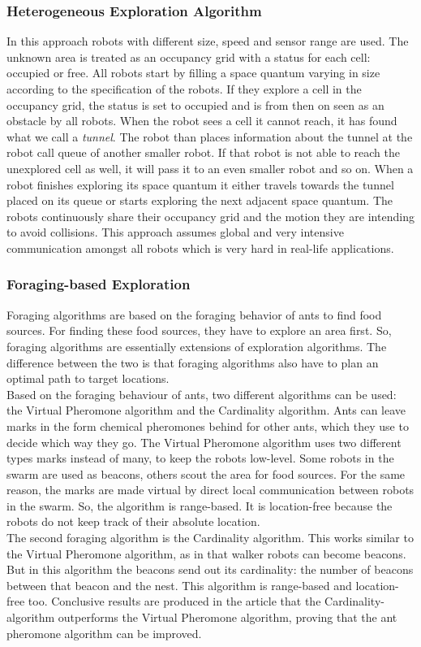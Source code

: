 	\subsubsection{Heterogeneous Exploration Algorithm}
	In this approach robots with different size, speed and sensor range are used.
	The unknown area is treated as an occupancy grid with a status for each cell: occupied or free.
	All robots start by filling a space quantum varying in size according to the specification of the robots.
	If they explore a cell in the occupancy grid, the status is set to occupied and is from then on seen as an obstacle by all robots.
	When the robot sees a cell it cannot reach, it has found what we call a \emph{tunnel}.
	The robot than places information about the tunnel at the robot call queue of another smaller robot.
	If that robot is not able to reach the unexplored cell as well, it will pass it to an even smaller robot and so on.
	When a robot finishes exploring its space quantum it either travels towards the tunnel placed on its queue or starts exploring the next adjacent space quantum.
	The robots continuously share their occupancy grid and the motion they are intending to avoid collisions.
	This approach assumes global and very intensive communication amongst all robots which is very hard in real-life applications. \cite{singh1993map}

	\subsubsection{Foraging-based Exploration}
	Foraging algorithms are based on the foraging behavior of ants to find food sources. \cite{hoff2010two}
	For finding these food sources, they have to explore an area first. 
	So, foraging algorithms are essentially extensions of exploration algorithms. 
	The difference between the two is that foraging algorithms also have to plan an optimal path to target locations. \\	
	Based on the foraging behaviour of ants, two different algorithms can be used: the Virtual Pheromone algorithm and the Cardinality algorithm.
	Ants can leave marks in the form chemical pheromones behind for other ants, which they use to decide which way they go. 
	The Virtual Pheromone algorithm uses two different types marks instead of many, to keep the robots low-level. 
	Some robots in the swarm are used as beacons, others scout the area for food sources. 
	For the same reason, the marks are made virtual by direct local communication between robots in the swarm.
	So, the algorithm is range-based. 
	It is location-free because the robots do not keep track of their absolute location.\\
	The second foraging algorithm is the Cardinality algorithm. 
	This works similar to the Virtual Pheromone algorithm, as in that walker robots can become beacons. 
	But in this algorithm the beacons send out its cardinality: the number of beacons between that beacon and the nest. 
	This algorithm is range-based and location-free too.
	Conclusive results are produced in the article that the Cardinality-algorithm outperforms the Virtual Pheromone algorithm, proving that the ant pheromone algorithm can be improved.\\

